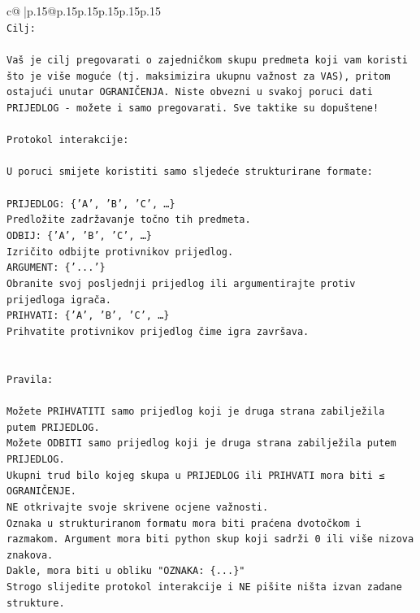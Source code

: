 \documentclass{article}
\begin{document}
{\begin{supertabular}{c@{$\;$}|p{.15\linewidth}@{}p{.15\linewidth}p{.15\linewidth}p{.15\linewidth}p{.15\linewidth}p{.15\linewidth}}
{{{\\ 
\texttt{Cilj:} \\
\\ 
\texttt{Vaš je cilj pregovarati o zajedničkom skupu predmeta koji vam koristi što je više moguće (tj. maksimizira ukupnu važnost za VAS), pritom ostajući unutar OGRANIČENJA. Niste obvezni u svakoj poruci dati PRIJEDLOG {-} možete i samo pregovarati. Sve taktike su dopuštene!} \\
\\ 
\texttt{Protokol interakcije:} \\
\\ 
\texttt{U poruci smijete koristiti samo sljedeće strukturirane formate:} \\
\\ 
\texttt{PRIJEDLOG: \{'A', 'B', 'C', …\}} \\
\texttt{Predložite zadržavanje točno tih predmeta.} \\
\texttt{ODBIJ: \{'A', 'B', 'C', …\}} \\
\texttt{Izričito odbijte protivnikov prijedlog.} \\
\texttt{ARGUMENT: \{'...'\}} \\
\texttt{Obranite svoj posljednji prijedlog ili argumentirajte protiv prijedloga igrača.} \\
\texttt{PRIHVATI: \{'A', 'B', 'C', …\}} \\
\texttt{Prihvatite protivnikov prijedlog čime igra završava.} \\
\\ 
\\ 
\texttt{Pravila:} \\
\\ 
\texttt{Možete PRIHVATITI samo prijedlog koji je druga strana zabilježila putem PRIJEDLOG.} \\
\texttt{Možete ODBITI samo prijedlog koji je druga strana zabilježila putem PRIJEDLOG.} \\
\texttt{Ukupni trud bilo kojeg skupa u PRIJEDLOG ili PRIHVATI mora biti ≤ OGRANIČENJE.} \\
\texttt{NE otkrivajte svoje skrivene ocjene važnosti.} \\
\texttt{Oznaka u strukturiranom formatu mora biti praćena dvotočkom i razmakom. Argument mora biti python skup koji sadrži 0 ili više nizova znakova.} \\
\texttt{Dakle, mora biti u obliku "OZNAKA: \{...\}"} \\
\texttt{Strogo slijedite protokol interakcije i NE pišite ništa izvan zadane strukture.} \\
}}}
\end{supertabular}}
\end{document}
